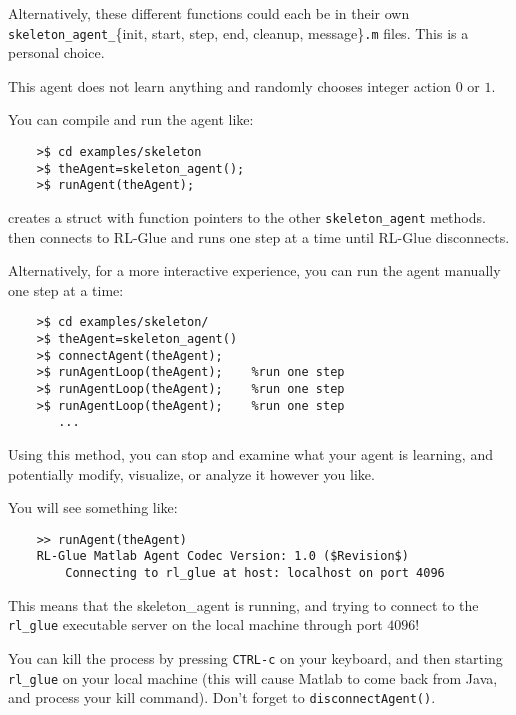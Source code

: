 \documentclass[11pt]{article}
\begin{document}
Alternatively, these different functions could each be in their own \texttt{skeleton\_agent\_}\{init, start, step, end, cleanup, message\}\texttt{.m} files.  This is a personal choice.

This agent does not learn anything and randomly chooses integer action $0$ or $1$.  

You can compile and run the agent like:
\begin{verbatim}
	>$ cd examples/skeleton
	>$ theAgent=skeleton_agent();
	>$ runAgent(theAgent);
\end{verbatim}

 creates a struct with function pointers to the other \texttt{skeleton\_agent} methods.   then
connects to RL-Glue and runs one step at a time until RL-Glue disconnects.

Alternatively, for a more interactive experience, you can run the agent manually one step at a time:
\begin{verbatim}
	>$ cd examples/skeleton/
	>$ theAgent=skeleton_agent()
	>$ connectAgent(theAgent);
	>$ runAgentLoop(theAgent);    %run one step
	>$ runAgentLoop(theAgent);    %run one step
	>$ runAgentLoop(theAgent);    %run one step
	   ...
\end{verbatim}

Using this method, you can stop and examine what your agent is learning, and potentially modify, visualize, or analyze it however you like.

You will see something like:
\begin{verbatim}
	>> runAgent(theAgent)
	RL-Glue Matlab Agent Codec Version: 1.0 ($Revision$)
	    Connecting to rl_glue at host: localhost on port 4096
\end{verbatim}

This means that the skeleton\_agent is running, and trying to connect to the \texttt{rl\_glue} executable server on the local machine through port $4096$! 

You can kill the process by pressing \texttt{CTRL-c} on your keyboard, and then starting  \texttt{rl\_glue} on your local machine (this will cause Matlab to come back from Java, and 
process your kill command).  Don't forget to \texttt{disconnectAgent()}.
\end{document}
